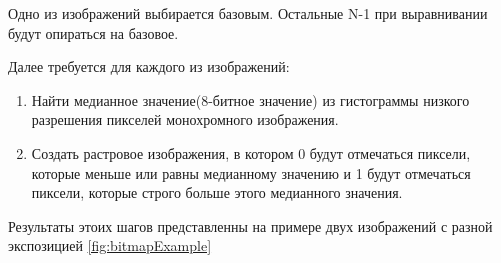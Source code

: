     Одно из изображений выбирается базовым. Остальные N-1 при выравнивании будут опираться на базовое.

    Далее требуется для каждого из изображений:
\begin{enumerate}
    \item Найти медианное значение(8-битное значение) из гистограммы низкого разрешения пикселей монохромного изображения. 
    \item Создать растровое изображения, в котором 0 будут отмечаться пиксели, которые меньше или равны медианному значению и 1 будут отмечаться пиксели, которые строго больше этого медианного значения.
\end{enumerate}

    Результаты этоих шагов представленны на примере двух изображений с разной экспозицией \ref{fig:bitmapExample}

\begin{figure}[ht!]
\end{figure}

